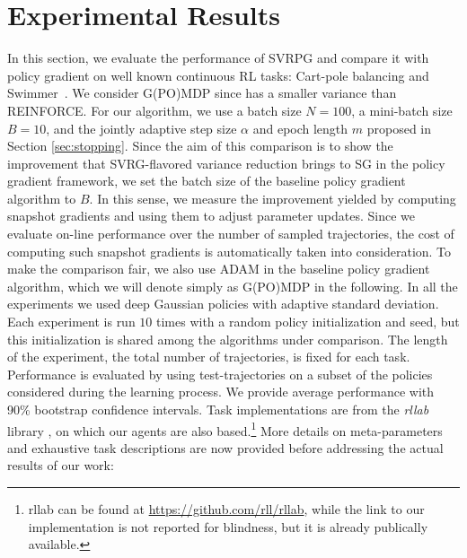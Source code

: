 \section{Experimental Results}\label{sec:exp}
\vspace{-0.05in}
In this section, we evaluate the performance of \acs{SVRPG} and compare it with policy gradient on well known continuous \acs{RL} tasks: Cart-pole balancing and Swimmer~\citep[\eg][]{duan2016benchmarking}.
We consider G(PO)MDP since has a smaller variance than REINFORCE.
For our algorithm, we use a batch size $N=100$, a mini-batch size $B=10$, and the jointly adaptive step size $\alpha$ and epoch length $m$ proposed in Section \ref{sec:stopping}. Since the aim of this comparison is to show the improvement that \acs{SVRG}-flavored variance reduction brings to \acs{SG} in the policy gradient framework, we set the batch size of the baseline policy gradient algorithm to $B$. In this sense, we measure the improvement yielded by computing snapshot gradients and using them to adjust parameter updates. Since we evaluate on-line performance over the number of sampled trajectories, the cost of computing such snapshot gradients is automatically taken into consideration. To make the comparison fair, we also use \acs{ADAM} in the baseline policy gradient algorithm, which we will denote simply as G(PO)MDP in the following.
In all the experiments we used deep Gaussian policies with adaptive standard deviation.
Each experiment is run $10$ times with a random policy initialization and seed, but this initialization is shared among the algorithms under comparison.
The length of the experiment, \ie the total number of trajectories, is fixed for each task. Performance is evaluated by using test-trajectories on a subset of the policies considered during the learning process. We provide average performance with 90\% bootstrap confidence intervals.  
Task implementations are from the \textit{rllab} library \cite{duan2016benchmarking}, on which our agents are also based.\footnote{rllab can be found at \url{https://github.com/rll/rllab}, while the link to our implementation is not reported for blindness, but it is already publically available.}
More details on meta-parameters and exhaustive task descriptions are now provided before addressing the actual results of our work:
